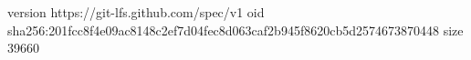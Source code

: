 version https://git-lfs.github.com/spec/v1
oid sha256:201fcc8f4e09ac8148c2ef7d04fec8d063caf2b945f8620cb5d2574673870448
size 39660
